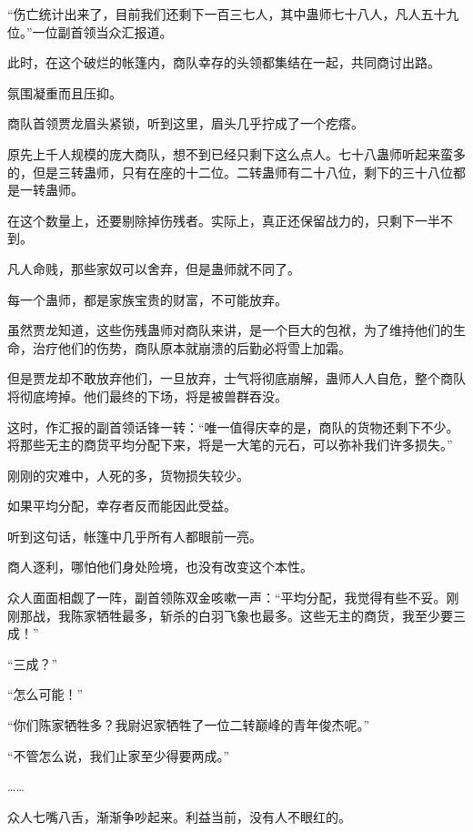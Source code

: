 
\begin{this_body}



“伤亡统计出来了，目前我们还剩下一百三七人，其中蛊师七十八人，凡人五十九位。”一位副首领当众汇报道。

此时，在这个破烂的帐篷内，商队幸存的头领都集结在一起，共同商讨出路。

氛围凝重而且压抑。

商队首领贾龙眉头紧锁，听到这里，眉头几乎拧成了一个疙瘩。

原先上千人规模的庞大商队，想不到已经只剩下这么点人。七十八蛊师听起来蛮多的，但是三转蛊师，只有在座的十二位。二转蛊师有二十八位，剩下的三十八位都是一转蛊师。

在这个数量上，还要剔除掉伤残者。实际上，真正还保留战力的，只剩下一半不到。

凡人命贱，那些家奴可以舍弃，但是蛊师就不同了。

每一个蛊师，都是家族宝贵的财富，不可能放弃。

虽然贾龙知道，这些伤残蛊师对商队来讲，是一个巨大的包袱，为了维持他们的生命，治疗他们的伤势，商队原本就崩溃的后勤必将雪上加霜。

但是贾龙却不敢放弃他们，一旦放弃，士气将彻底崩解，蛊师人人自危，整个商队将彻底垮掉。他们最终的下场，将是被兽群吞没。

这时，作汇报的副首领话锋一转：“唯一值得庆幸的是，商队的货物还剩下不少。将那些无主的商货平均分配下来，将是一大笔的元石，可以弥补我们许多损失。”

刚刚的灾难中，人死的多，货物损失较少。

如果平均分配，幸存者反而能因此受益。

听到这句话，帐篷中几乎所有人都眼前一亮。

商人逐利，哪怕他们身处险境，也没有改变这个本性。

众人面面相觑了一阵，副首领陈双金咳嗽一声：“平均分配，我觉得有些不妥。刚刚那战，我陈家牺牲最多，斩杀的白羽飞象也最多。这些无主的商货，我至少要三成！”

“三成？”

“怎么可能！”

“你们陈家牺牲多？我尉迟家牺牲了一位二转巅峰的青年俊杰呢。”

“不管怎么说，我们止家至少得要两成。”

……

众人七嘴八舌，渐渐争吵起来。利益当前，没有人不眼红的。


\end{this_body}
